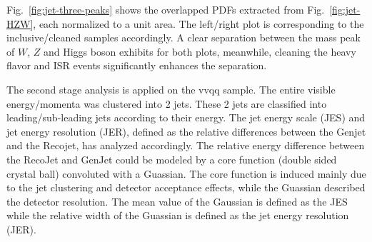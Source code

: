 Fig.~\ref{fig:jet-three-peaks} shows the overlapped PDFs extracted from Fig.~\ref{fig:jet-HZW}, each normalized to a unit area.
The left/right plot is corresponding to the inclusive/cleaned samples accordingly.
A clear separation between the mass peak of $W$, $Z$ and Higgs boson exhibits for both plots, meanwhile,
cleaning the heavy flavor and ISR events significantly enhances the separation. 

The second stage analysis is applied on the vvqq sample. The entire visible energy/momenta was clustered into 2 jets. These 2 jets are classified into leading/sub-leading jets according to their energy. The jet energy scale (JES) and jet energy resolution (JER), defined as the relative differences between the Genjet and the Recojet, has analyzed accordingly. The relative energy difference between the RecoJet and GenJet could be modeled by a core function (double sided crystal ball) convoluted with a Guassian. The core function is induced mainly due to the jet clustering and detector acceptance effects, while the Guassian described the detector resolution. The mean value of the Gaussian is defined as the JES while the relative width of the Guassian is defined as the jet energy resolution (JER).

